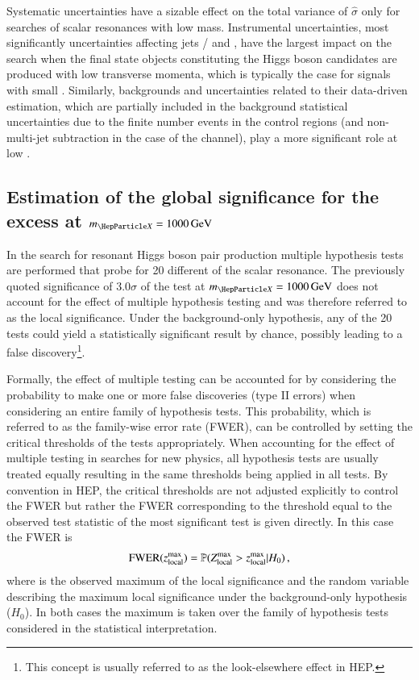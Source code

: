 Systematic uncertainties have a sizable effect on the total variance
of $\hat{\sigma}$ only for searches of scalar resonances with low
mass. Instrumental uncertainties, most significantly uncertainties
affecting jets / \pTmissAbs and \tauhadvis, have the largest impact on
the search when the final state objects constituting the Higgs boson
candidates are produced with low transverse momenta, which is
typically the case for signals with small \mX. Similarly,
\faketauhadvis backgrounds and uncertainties related to their
data-driven estimation, which are partially included in the background
statistical uncertainties due to the finite number events in the
control regions (and non-multi-jet subtraction in the case of the
\hadhad channel), play a more significant role at low \mX.




\subsection{Estimation of the global significance for the excess at
  $\mX = \SI{1000}{\GeV}$}%
\label{sec:global_significance}

In the search for resonant Higgs boson pair production multiple
hypothesis tests are performed that probe for 20 different \mX of the
scalar resonance. The previously quoted significance of $3.0\sigma$ of
the test at $\mX = \SI{1000}{\GeV}$ does not account for the effect of
multiple hypothesis testing and was therefore referred to as the local
significance. Under the background-only hypothesis, any of the 20
tests could yield a statistically significant result by chance,
possibly leading to a false discovery\footnote{This concept is usually
  referred to as the look-elsewhere effect in HEP.}.

Formally, the effect of multiple testing can be accounted for by
considering the probability to make one or more false discoveries
(type II errors) when considering an entire family of hypothesis
tests.
This probability, which is referred to as the family-wise error rate
(FWER), can be controlled by setting the critical thresholds of the
tests appropriately. When accounting for the effect of multiple
testing in searches for new physics, all hypothesis tests are usually
treated equally resulting in the same thresholds being applied in all
tests. By convention in HEP, the critical thresholds are not adjusted
explicitly to control the FWER but rather the FWER corresponding to
the threshold equal to the observed test statistic of the most
significant test is given directly. In this case the FWER is
\begin{align*}
  \text{FWER}(z_{\text{local}}^{\text{max}})
  = \mathbb{P}(Z_{\text{local}}^{\text{max}} > z_{\text{local}}^{\text{max}} \vert H_0)\,\text{,}
\end{align*}
where \zmaxlocal is the observed maximum of the local significance and
\Zmaxlocal the random variable describing the maximum local
significance under the background-only hypothesis ($H_0$). In both
cases the maximum is taken over the family of hypothesis tests
considered in the statistical interpretation.

